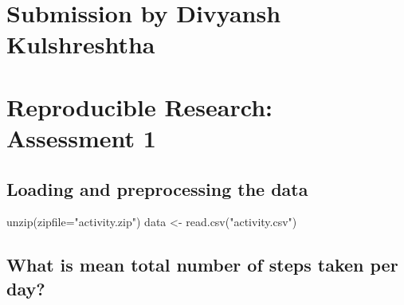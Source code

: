 \documentclass[
]{article}
\author{}
\date{\vspace{-2.5em}}
\newenvironment{Shaded}{\begin{snugshade}}{\end{snugshade}}
\newcommand{\AttributeTok}[1]{\textcolor[rgb]{0.77,0.63,0.00}{#1}}
\newcommand{\ConstantTok}[1]{\textcolor[rgb]{0.00,0.00,0.00}{#1}}
\newcommand{\DecValTok}[1]{\textcolor[rgb]{0.00,0.00,0.81}{#1}}
\newcommand{\FunctionTok}[1]{\textcolor[rgb]{0.00,0.00,0.00}{#1}}
\newcommand{\NormalTok}[1]{#1}
\newcommand{\OtherTok}[1]{\textcolor[rgb]{0.56,0.35,0.01}{#1}}
\newcommand{\SpecialCharTok}[1]{\textcolor[rgb]{0.00,0.00,0.00}{#1}}
\newcommand{\StringTok}[1]{\textcolor[rgb]{0.31,0.60,0.02}{#1}}
\begin{document}
\hypertarget{submission-by-divyansh-kulshreshtha}{%
\section{Submission by Divyansh
Kulshreshtha}\label{submission-by-divyansh-kulshreshtha}}

\hypertarget{reproducible-research-assessment-1}{%
\section{Reproducible Research: Assessment
1}\label{reproducible-research-assessment-1}}

\hypertarget{loading-and-preprocessing-the-data}{%
\subsection{Loading and preprocessing the
data}\label{loading-and-preprocessing-the-data}}

\begin{Shaded}
\begin{Highlighting}[]
\FunctionTok{unzip}\NormalTok{(}\AttributeTok{zipfile=}\StringTok{"activity.zip"}\NormalTok{)}
\NormalTok{data }\OtherTok{\textless{}{-}} \FunctionTok{read.csv}\NormalTok{(}\StringTok{"activity.csv"}\NormalTok{)}
\end{Highlighting}
\end{Shaded}

\hypertarget{what-is-mean-total-number-of-steps-taken-per-day}{%
\subsection{What is mean total number of steps taken per
day?}\label{what-is-mean-total-number-of-steps-taken-per-day}}

\begin{Shaded}
\end{Shaded}
\end{document}
